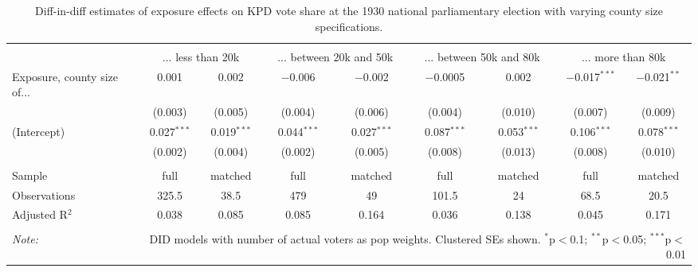 
\begin{table}[!htbp] \centering 
  \caption{Diff-in-diff estimates of exposure effects on KPD vote share at the 1930 national parliamentary election with varying county size specifications.\vspace{-.25cm}} 
  \label{tab:nsdap-voteshare-kpd-countysize-dd-1930} 
\scriptsize 
\begin{tabular}{@{\extracolsep{5pt}}lcccccccc} 
\\[-1.8ex]\hline 
\hline \\[-1.8ex] 
 & \multicolumn{2}{c}{... less than 20k } & \multicolumn{2}{c}{... between 20k and 50k} & \multicolumn{2}{c}{... between 50k and 80k} & \multicolumn{2}{c}{... more than 80k} \\ 
 \cmidrule(r){2-3}\cmidrule(r){4-5}\cmidrule(r){6-7}\cmidrule(r){8-9}Exposure, county size of... & 0.001 & 0.002 & $-$0.006 & $-$0.002 & $-$0.0005 & 0.002 & $-$0.017$^{***}$ & $-$0.021$^{**}$ \\ 
  & (0.003) & (0.005) & (0.004) & (0.006) & (0.004) & (0.010) & (0.007) & (0.009) \\ 
  (Intercept) & 0.027$^{***}$ & 0.019$^{***}$ & 0.044$^{***}$ & 0.027$^{***}$ & 0.087$^{***}$ & 0.053$^{***}$ & 0.106$^{***}$ & 0.078$^{***}$ \\ 
  & (0.002) & (0.004) & (0.002) & (0.005) & (0.008) & (0.013) & (0.008) & (0.010) \\ 
 \hline \\[-1.8ex] 
Sample & full & matched & full & matched & full & matched & full & matched \\ 
Observations & 325.5 & 38.5 & 479 & 49 & 101.5 & 24 & 68.5 & 20.5 \\ 
Adjusted R$^{2}$ & 0.038 & 0.085 & 0.085 & 0.164 & 0.036 & 0.138 & 0.045 & 0.171 \\ 
\hline 
\hline \\[-1.8ex] 
\textit{Note:}  & \multicolumn{8}{r}{DID models with number of actual voters as pop weights. Clustered SEs shown. $^{*}$p$<$0.1; $^{**}$p$<$0.05; $^{***}$p$<$0.01} \\ 
\end{tabular} 
\end{table} 
